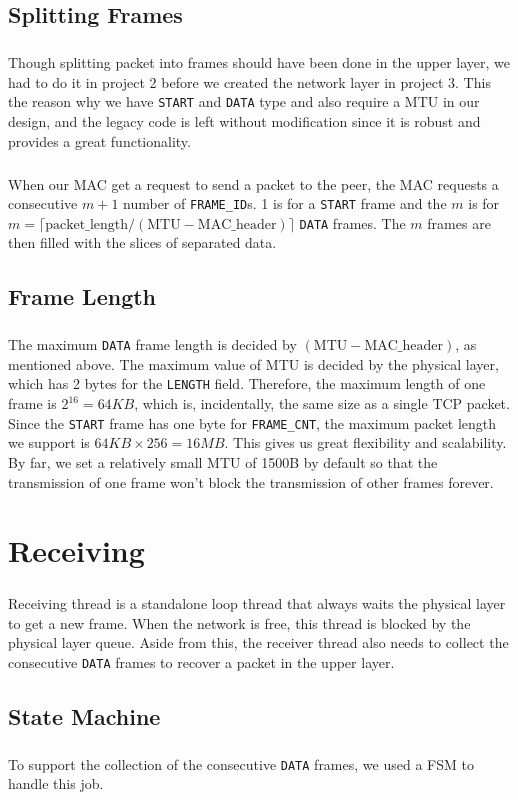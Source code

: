     \subsection{Splitting Frames}
        \subparagraph{}
        Though splitting packet into frames should have been done in the upper layer, we had to do it in project 2 before we created the network layer in project 3. This the reason why we have \texttt{START} and \texttt{DATA} type and also require a MTU in our design, and the legacy code is left without modification since it is robust and provides a great functionality.
        \subparagraph{}
        When our MAC get a request to send a packet to the peer, the MAC requests a consecutive $m+1$ number of \texttt{FRAME\_ID}s. 1 is for a \texttt{START} frame and the $m$ is for $m=\lceil \text{packet\_length} / (\text{MTU} - \text{MAC\_header})  \rceil$ \texttt{DATA} frames. The $m$ frames are then filled with the slices of separated data.

    \subsection{Frame Length}
        \subparagraph{}
        The maximum \texttt{DATA} frame length is decided by $(\text{MTU} - \text{MAC\_header})$, as mentioned above. The maximum value of MTU is decided by the physical layer, which has 2 bytes for the \texttt{LENGTH} field. Therefore, the maximum length of one frame is $2^{16}=64KB$, which is, incidentally, the same size as a single TCP packet. Since the \texttt{START} frame has one byte for \texttt{FRAME\_CNT}, the maximum packet length we support is $64KB \times 256=16MB$. This gives us great flexibility and scalability. By far, we set a relatively small MTU of 1500B by default so that the transmission of one frame won't block the transmission of other frames forever.

\section{Receiving}
    \subparagraph{}
    Receiving thread is a standalone loop thread that always waits the physical layer to get a new frame. When the network is free, this thread is blocked by the physical layer queue. Aside from this, the receiver thread also needs to collect the consecutive \texttt{DATA} frames to recover a packet in the upper layer.

    \subsection{State Machine}
        \subparagraph{}
        To support the collection of the consecutive {\tt DATA} frames, we used a FSM to handle this job.
        
